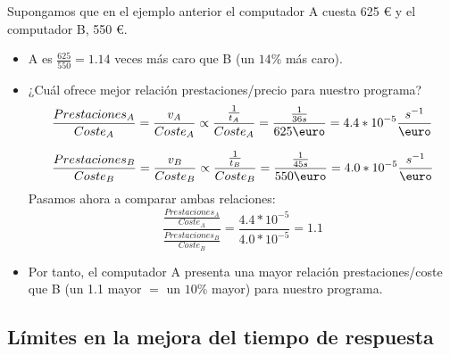 \documentclass[12pt,spanish]{article}
\begin{document}
Supongamos que en el ejemplo anterior el computador A cuesta 625 \textup{\euro} y el computador B, 550 \textup{\euro}.
\begin{itemize}
	\item A es $\frac{625}{550}=1.14$ veces más caro que B (un $14\%$ más caro).
	\item ¿Cuál ofrece mejor relación prestaciones/precio para nuestro programa?
	\[
		\frac{Prestaciones_A}{Coste_A}=\frac{v_A}{Coste_A} \propto \frac{\frac{1}{t_A}}{Coste_A}=\frac{\frac{1}{36 s}}{625 \textup{\euro}} = 4.4 * 10^{-5} \frac{s^{-1}}{\textup{\euro}}
	\]

	\[
		\frac{Prestaciones_B}{Coste_B}=\frac{v_B}{Coste_B} \propto \frac{\frac{1}{t_B}}{Coste_B}=\frac{\frac{1}{45 s}}{550 \textup{\euro}} = 4.0 * 10^{-5} \frac{s^{-1}}{\textup{\euro}}
	\]
	Pasamos ahora a comparar ambas relaciones:
	\[
	\frac{\frac{Prestaciones_A}{Coste_A}}{\frac{Prestaciones_B}{Coste_B}} = \frac{4.4 * 10^{-5}}{4.0 * 10^{-5}} = 1.1
	\]
	\item Por tanto, el computador A presenta una mayor relación prestaciones/coste que B (un 1.1 mayor $=$ un $10\%$ mayor) para nuestro programa.
\end{itemize}


\subsection{Límites en la mejora del tiempo de respuesta}
\end{document}
